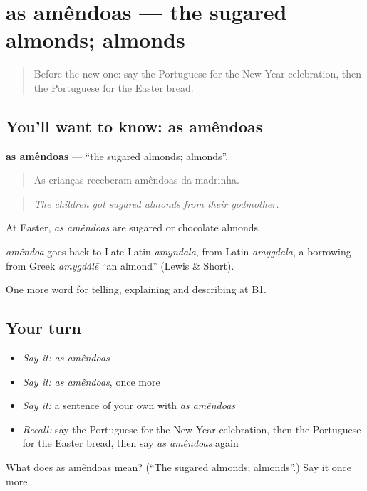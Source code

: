 \section[as amêndoas]{as amêndoas — the sugared almonds; almonds}

\label{lesson:PT-C323-amendoas}



\begin{quote}
Before the new one: say the Portuguese for the New Year celebration, then the Portuguese for the Easter bread.
\end{quote}

\subsection*{You'll want to know: as amêndoas}
\textbf{as amêndoas} — \textquotedblleft{}the sugared almonds; almonds\textquotedblright{}.

\begin{quote}
As crianças receberam amêndoas da madrinha.
\end{quote}

\begin{quote}
\emph{The children got sugared almonds from their godmother.}
\end{quote}

At Easter, \emph{as amêndoas} are sugared or chocolate almonds.

\begin{cousinweb}
\emph{amêndoa} goes back to Late Latin \emph{amyndala}, from Latin \emph{amygdala}, a borrowing from Greek \emph{amygdálē} \textquotedblleft{}an almond\textquotedblright{} (Lewis \& Short).
\end{cousinweb}

\begin{grammarlens}[title={What you've built}]
One more word for telling, explaining and describing at B1.
\end{grammarlens}

\subsection*{Your turn}
\begin{itemize}
\raggedright
  \item \emph{Say it:} \emph{as amêndoas}
  \item \emph{Say it:} \emph{as amêndoas}, once more
  \item \emph{Say it:} a sentence of your own with \emph{as amêndoas}
  \item \emph{Recall:} say the Portuguese for the New Year celebration, then the Portuguese for the Easter bread, then say \emph{as amêndoas} again
\end{itemize}

\begin{tcolorbox}[breakable,colback=teal!4,colframe=teal!35!black,title={Before you move on}]
What does as amêndoas mean? (\textquotedblleft{}The sugared almonds; almonds\textquotedblright{}.) Say it once more.
\end{tcolorbox}
